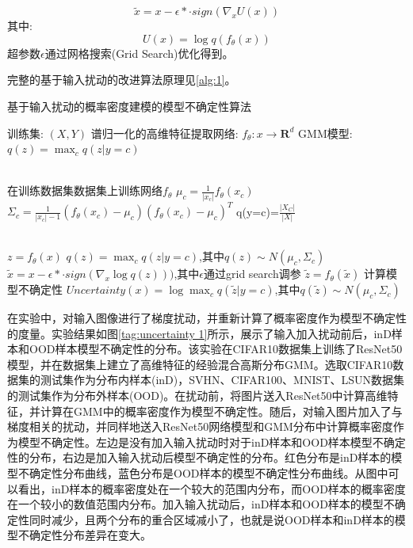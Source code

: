 \begin{equation}
    \tilde{x}=x-\epsilon* \cdot sign(\nabla_x U(x))
    \label{perturb}
\end{equation}
其中:
\begin{equation}
    U(x)=\log q(f_{\theta}(x))
\end{equation}
超参数$\epsilon$通过网格搜索(Grid Search)优化得到。


完整的基于输入扰动的改进算法原理见\ref{alg:1}。


\begin{algorithm}[h]
	\caption{基于输入扰动的概率密度建模的模型不确定性算法}
	\label{alg:1}
	
	\begin{algorithmic}[1]
		\Require 训练集: $(X,Y)$ 
		\Require 谱归一化的高维特征提取网络: $f_{\theta}:x \rightarrow \mathbf{R}^d $ 
		\Require GMM模型: $q(z) = \max_{c}q(z|y=c)$
		
		\\
		\State 在训练数据集数据集上训练网络$f_{\theta}$
		\State $\mu_{c}=\frac{1}{|x_c|}f_{\theta}(x_c)$
		\State $\Sigma_c = \frac{1}{|x_c|-1}(f_{\theta}(x_c)-\mu_c)(f_{\theta}(x_c)-\mu_c)^T$
		\State q(y=c)=$\frac{|X_C|}{|X|}$
		\EndFor
		\EndProcedure

		
		\\
		\State $z=f_{\theta}(x)$
		\State  $q(z) = \max_{c}q(z|y=c)$,其中$q(z)\sim N(\mu_c,\Sigma_c)$
		\State $\tilde{x}=x-\epsilon* \cdot sign(\nabla_x \log q(z)))$,其中$\epsilon$通过grid search调参
		\State $\tilde{z}=f_{\theta}(\tilde{x})$
		\State 计算模型不确定性 $Uncertainty(x) = \log \max_{c}q(\tilde{z}|y=c)$,其中$q(\tilde{z})\sim N(\mu_c,\Sigma_c)$
		\EndProcedure 
	\end{algorithmic}
\end{algorithm}


在实验中，对输入图像进行了梯度扰动，并重新计算了概率密度作为模型不确定性的度量。实验结果如图\ref{tag:uncertainty 1}所示，展示了输入加入扰动前后，inD样本和OOD样本模型不确定性的分布。该实验在CIFAR10数据集上训练了ResNet50模型，并在数据集上建立了高维特征的经验混合高斯分布GMM。选取CIFAR10数据集的测试集作为分布内样本(inD)，SVHN、CIFAR100、MNIST、LSUN数据集的测试集作为分布外样本(OOD)。在扰动前，将图片送入ResNet50中计算高维特征，并计算在GMM中的概率密度作为模型不确定性。随后，对输入图片加入了与梯度相关的扰动，并同样地送入ResNet50网络模型和GMM分布中计算概率密度作为模型不确定性。左边是没有加入输入扰动时对于inD样本和OOD样本模型不确定性的分布，右边是加入输入扰动后模型不确定性的分布。红色分布是inD样本的模型不确定性分布曲线，蓝色分布是OOD样本的模型不确定性分布曲线。从图中可以看出，inD样本的概率密度处在一个较大的范围内分布，而OOD样本的概率密度在一个较小的数值范围内分布。加入输入扰动后，inD样本和OOD样本的模型不确定性同时减少，且两个分布的重合区域减小了，也就是说OOD样本和inD样本的模型不确定性分布差异在变大。


